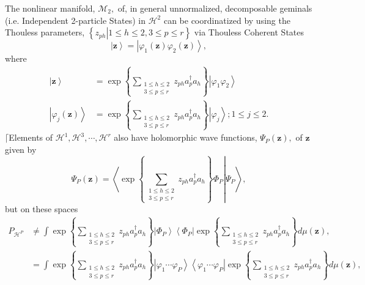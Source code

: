 \documentclass[aps,preprint]{revtex4}%
\begin{document}
The nonlinear manifold, $\mathcal{M}_{2},$ of, in general unnormalized,
decomposable geminals (i.e. Independent 2-particle States) in $\mathcal{H}%
^{2}$ can be coordinatized by using the Thouless parameters, $\left\{  \left.
z_{ph}\right\vert 1\leq h\leq2,3\leq p\leq r\right\}  $ via Thouless Coherent
States
\begin{equation}
\left\vert \mathbf{z}\right\rangle =\left\vert \varphi_{1}\left(
\mathbf{z}\right)  \varphi_{2}\left(  \mathbf{z}\right)  \right\rangle ,
\end{equation}
where
\begin{align}
\left\vert \mathbf{z}\right\rangle  &  =\exp\left\{  \sum
\limits_{\substack{1\leq h\leq2\\3\leq p\leq r}}z_{ph}a_{p}^{\dagger}%
a_{h}\right\}  \left\vert \varphi_{1}\varphi_{2}\right\rangle \\
\left\vert \varphi_{j}\left(  \mathbf{z}\right)  \right\rangle  &
=\exp\left\{  \sum\limits_{\substack{1\leq h\leq2\\3\leq p\leq r}}z_{ph}%
a_{p}^{\dagger}a_{h}\right\}  \left\vert \varphi_{j}\right\rangle ;1\leq
j\leq2.
\end{align}
$\lceil$Elements of $\mathcal{H}^{1},\mathcal{H}^{3},\cdots,\mathcal{H}^{r}$
also have holomorphic wave functions, $\Psi_{P}\left(  \mathbf{z}\right)  ,$
of $\mathbf{z}$ given by
\begin{equation}
\Psi_{P}\left(  \mathbf{z}\right)  =\left\langle \left.  \exp\left\{
\sum\limits_{\substack{1\leq h\leq2\\3\leq p\leq r}}z_{ph}a_{p}^{\dagger}%
a_{h}\right\}  \Phi_{P}\right\vert \Psi_{P}\right\rangle ,
\end{equation}
but on these spaces
\begin{align}
P_{\mathcal{H}^{P}}  &  \neq\int\exp\left\{  \sum\limits_{\substack{1\leq
h\leq2\\3\leq p\leq r}}z_{ph}a_{p}^{\dagger}a_{h}\right\}  \left\vert \Phi
_{P}\right\rangle \left\langle \Phi_{P}\right\vert \exp\left\{  \sum
\limits_{\substack{1\leq h\leq2\\3\leq p\leq r}}z_{ph}a_{p}^{\dagger}%
a_{h}\right\}  d\mu\left(  \mathbf{z}\right)  ,\nonumber\\
&  =\int\exp\left\{  \sum\limits_{\substack{1\leq h\leq2\\3\leq p\leq
r}}z_{ph}a_{p}^{\dagger}a_{h}\right\}  \left\vert \varphi_{1}\cdots\varphi
_{P}\right\rangle \left\langle \varphi_{1}\cdots\varphi_{P}\right\vert
\exp\left\{  \sum\limits_{\substack{1\leq h\leq2\\3\leq p\leq r}}z_{ph}%
a_{p}^{\dagger}a_{h}\right\}  d\mu\left(  \mathbf{z}\right)  ,
\end{align}
\end{document}
